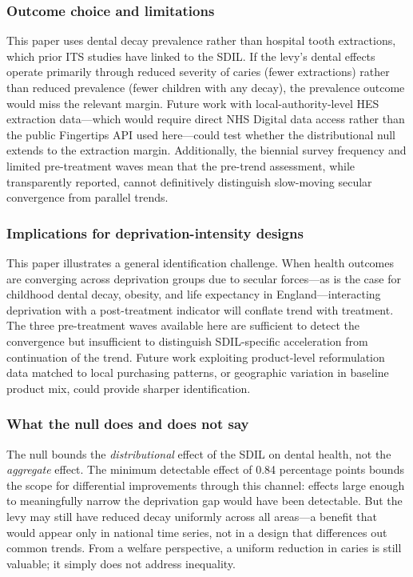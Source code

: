 \documentclass[12pt]{article}
\begin{document}
\subsubsection*{Outcome choice and limitations} This paper uses dental decay prevalence rather than hospital tooth extractions, which prior ITS studies have linked to the SDIL. If the levy's dental effects operate primarily through reduced severity of caries (fewer extractions) rather than reduced prevalence (fewer children with any decay), the prevalence outcome would miss the relevant margin. Future work with local-authority-level HES extraction data---which would require direct NHS Digital data access rather than the public Fingertips API used here---could test whether the distributional null extends to the extraction margin. Additionally, the biennial survey frequency and limited pre-treatment waves mean that the pre-trend assessment, while transparently reported, cannot definitively distinguish slow-moving secular convergence from parallel trends.

\subsubsection*{Implications for deprivation-intensity designs} This paper illustrates a general identification challenge. When health outcomes are converging across deprivation groups due to secular forces---as is the case for childhood dental decay, obesity, and life expectancy in England---interacting deprivation with a post-treatment indicator will conflate trend with treatment. The three pre-treatment waves available here are sufficient to detect the convergence but insufficient to distinguish SDIL-specific acceleration from continuation of the trend. Future work exploiting product-level reformulation data matched to local purchasing patterns, or geographic variation in baseline product mix, could provide sharper identification.

\subsubsection*{What the null does and does not say} The null bounds the \textit{distributional} effect of the SDIL on dental health, not the \textit{aggregate} effect. The minimum detectable effect of 0.84 percentage points bounds the scope for differential improvements through this channel: effects large enough to meaningfully narrow the deprivation gap would have been detectable. But the levy may still have reduced decay uniformly across all areas---a benefit that would appear only in national time series, not in a design that differences out common trends. From a welfare perspective, a uniform reduction in caries is still valuable; it simply does not address inequality.
\end{document}
